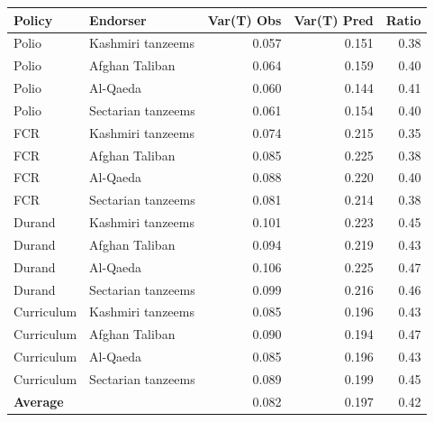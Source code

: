 \begin{tabular}{llrrr}
\toprule
Policy & Endorser & Var(T) Obs & Var(T) Pred & Ratio \\
\midrule
Polio & Kashmiri tanzeems & 0.057 & 0.151 & 0.38 \\
Polio & Afghan Taliban & 0.064 & 0.159 & 0.40 \\
Polio & Al-Qaeda & 0.060 & 0.144 & 0.41 \\
Polio & Sectarian tanzeems & 0.061 & 0.154 & 0.40 \\
FCR & Kashmiri tanzeems & 0.074 & 0.215 & 0.35 \\
FCR & Afghan Taliban & 0.085 & 0.225 & 0.38 \\
FCR & Al-Qaeda & 0.088 & 0.220 & 0.40 \\
FCR & Sectarian tanzeems & 0.081 & 0.214 & 0.38 \\
Durand & Kashmiri tanzeems & 0.101 & 0.223 & 0.45 \\
Durand & Afghan Taliban & 0.094 & 0.219 & 0.43 \\
Durand & Al-Qaeda & 0.106 & 0.225 & 0.47 \\
Durand & Sectarian tanzeems & 0.099 & 0.216 & 0.46 \\
Curriculum & Kashmiri tanzeems & 0.085 & 0.196 & 0.43 \\
Curriculum & Afghan Taliban & 0.090 & 0.194 & 0.47 \\
Curriculum & Al-Qaeda & 0.085 & 0.196 & 0.43 \\
Curriculum & Sectarian tanzeems & 0.089 & 0.199 & 0.45 \\
\midrule
\textbf{Average} &  & 0.082 & 0.197 & 0.42 \\
\bottomrule
\end{tabular}
